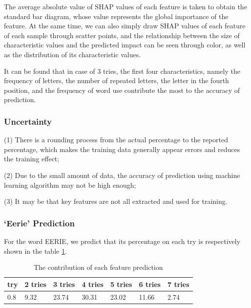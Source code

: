 \documentclass[
  journal=medium,
  manuscript=Report,
  year=2023,
  volume=37,
]{cup-journal}
\begin{document}
The average absolute value of SHAP values of each feature is taken to obtain the standard bar diagram, whose value represents the global importance of the feature. At the same time, we can also simply draw SHAP values of each feature of each sample through scatter points, and the relationship between the size of characteristic values and the predicted impact can be seen through color, as well as the distribution of its characteristic values.

It can be found that in case of 3 tries, the first four characteristics, namely the frequency of letters, the number of repeated letters, the letter in the fourth position, and the frequency of word use contribute the most to the accuracy of prediction.

\subsubsection{Uncertainty}

(1) There is a rounding process from the actual percentage to the reported percentage, which makes the training data generally appear errors and reduces the training effect;

(2) Due to the small amount of data, the accuracy of prediction using machine learning algorithm may not be high enough;

(3) It may be that key features are not all extracted and used for training.

\subsubsection{‘Eerie’ Prediction}

For the word EERIE, we predict that its percentage on each try is respectively shown in the table \ref{prediction}.

\begin{table}[hbt!]
    \begin{threeparttable}
    \caption{The contribution of each feature prediction}
    \label{prediction}
    \begin{tabular}{lllllll}
    \toprule
    \headrow 1 try & 2 tries & 3 tries & 4 tries & 5 tries & 6 tries & 7 tries\\ 
    \midrule
    0.8 & 9.32 & 23.74 & 30.31 & 23.02 & 11.66 & 2.74\\ 
    \bottomrule 
    \end{tabular}
    \end{threeparttable}
\end{table}
\end{document}
